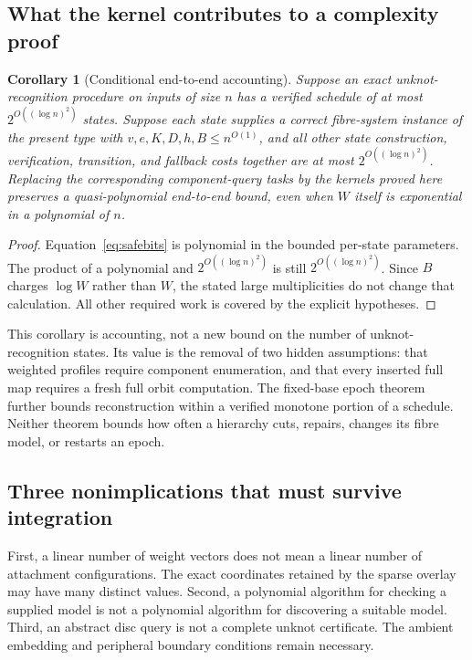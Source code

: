 \documentclass[11pt]{article}
\newtheorem{corollary}[theorem]{Corollary}
\theoremstyle{definition}
\begin{document}
\subsection{What the kernel contributes to a complexity proof}
\begin{corollary}[Conditional end-to-end accounting]
\label{cor:conditional}
Suppose an exact unknot-recognition procedure on inputs of size $n$ has a verified schedule of at most $2^{O((\log n)^2)}$ states. Suppose each state supplies a correct fibre-system instance of the present type with $v,e,K,D,h,B\le n^{O(1)}$, and all other state construction, verification, transition, and fallback costs together are at most $2^{O((\log n)^2)}$. Replacing the corresponding component-query tasks by the kernels proved here preserves a quasi-polynomial end-to-end bound, even when $W$ itself is exponential in a polynomial of $n$.
\end{corollary}
\begin{proof}
Equation~\eqref{eq:safebits} is polynomial in the bounded per-state parameters. The product of a polynomial and $2^{O((\log n)^2)}$ is still $2^{O((\log n)^2)}$. Since $B$ charges $\log W$ rather than $W$, the stated large multiplicities do not change that calculation. All other required work is covered by the explicit hypotheses.
\end{proof}

This corollary is accounting, not a new bound on the number of unknot-recognition states. Its value is the removal of two hidden assumptions: that weighted profiles require component enumeration, and that every inserted full map requires a fresh full orbit computation. The fixed-base epoch theorem further bounds reconstruction within a verified monotone portion of a schedule. Neither theorem bounds how often a hierarchy cuts, repairs, changes its fibre model, or restarts an epoch.

\subsection{Three nonimplications that must survive integration}
First, a linear number of weight vectors does not mean a linear number of attachment configurations. The exact coordinates retained by the sparse overlay may have many distinct values. Second, a polynomial algorithm for checking a supplied model is not a polynomial algorithm for discovering a suitable model. Third, an abstract disc query is not a complete unknot certificate. The ambient embedding and peripheral boundary conditions remain necessary.
\end{document}
